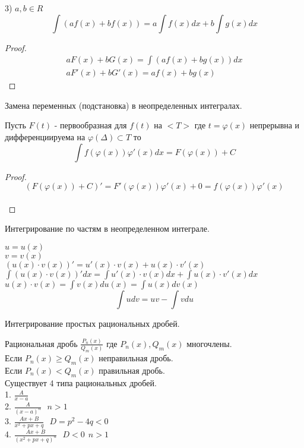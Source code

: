 3) $a, b \in R$\\
\[\int (af(x) + bf(x)) = a \int f(x)dx + b \int g(x)dx\]
\begin{proof}
  \begin{eqnarray*}
    aF(x) + bG(x) = \int (af(x) + bg(x))dx\\
    aF'(x) + bG'(x) = af(x) + bg(x)
  \end{eqnarray*}
\end{proof}

\begin{title}[\Large]
  Замена переменных (подстановка) в неопределенных интегралах.
\end{title}

\begin{theorem}
  Пусть $F(t)$ - первообразная для $f(t)$ на $<T>$ где $t = \varphi (x)$
  непрерывна и дифференциируема на $\varphi(\Delta) \subset T$ то\\
  \[\int f(\varphi (x)) \varphi'(x)dx = F(\varphi (x)) + C\]
\end{theorem}

\begin{proof}
  \[(F(\varphi(x)) + C)' = F'(\varphi (x)) \varphi'(x) + 0 = f(\varphi(x))
    \varphi'(x)\]\\
\end{proof}

\begin{title}[\Large]
  Интегрирование по частям в неопределенном интеграле.
\end{title}
$u = u(x)$\\
$v = v(x)$\\
$(u(x)\cdot v(x))' = u'(x)\cdot v(x) + u(x)\cdot v'(x)$\\
$\int(u(x)\cdot v(x))'dx = \int u'(x)\cdot v(x)dx + \int u(x)\cdot v'(x)dx$\\
$u(x)\cdot v(x) = \int v(x)du(x) = \int u(x)dv(x)$\\
\[\int udv = uv - \int vdu\]

\begin{title}[\Large]
  Интегрирование простых рациональных дробей.
\end{title}
Рациональная дробь $\frac{P_n(x)}{Q_m(x)}$ где $P_n(x), Q_m(x)$ многочлены.\\
Если $P_n(x) \ge Q_m(x)$ неправильная дробь.\\
Если $P_n(x) < Q_m(x)$ правильная дробь.\\

Существует 4 типа рациональных дробей.\\
1. $\frac{A}{x-a}$\\
2. $\frac{A}{(x-a)^n} ~~~ n > 1$\\
3. $\frac{Ax + B}{x^2 + px +q} ~~~ D = p^2 - 4q < 0$\\
4. $\frac{Ax + B}{(x^2 + px +q)^n} ~~~ D < 0 ~~ n > 1$\\

